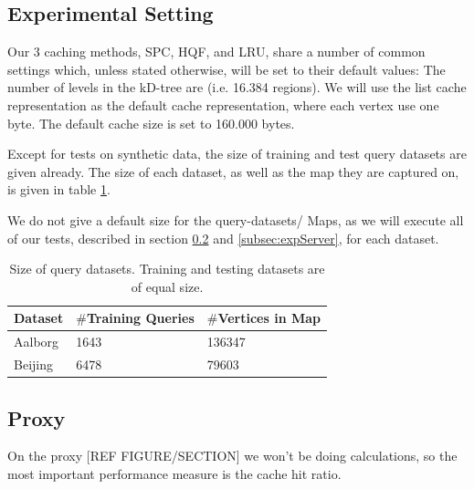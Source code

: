 \subsection{Experimental Setting}

% 

Our 3 caching methods, SPC, HQF, and LRU, share a number of common settings which, unless stated otherwise, will be set to their default values: 
The number of levels in the kD-tree are (i.e. 16.384 regions). We will use the list cache representation as the default cache representation, where each vertex use one byte. The default cache size is set to 160.000 bytes.

Except for tests on synthetic data, the size of training and test query datasets are given already. The size of each dataset, as well as the map they are captured on, is given in table \ref{tab:datasetsize}.

We do not give a default size for the query-datasets/ Maps, as we will execute all of our tests, described in section \ref{subsec:expProxy} and \ref{subsec:expServer}, for each dataset.


\begin{table}
\center
\begin{tabular}{|l|l|l|}\hline
Dataset & $\#$Training Queries & $\#$Vertices in Map \\\hline
Aalborg & 1643 & 136347 \\\hline
Beijing & 6478 & 79603 \\\hline
\end{tabular}
\caption{Size of query datasets. Training and testing datasets are of equal size.}
\label{tab:datasetsize}
\end{table}


\subsection{Proxy}\label{subsec:expProxy}

On the proxy [REF FIGURE/SECTION] we won't be doing \spath calculations, so the most important performance measure is the cache hit ratio.

